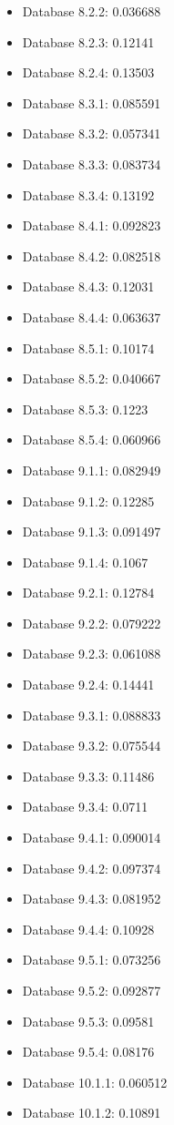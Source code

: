 \begin{itemize}
\item Database 8.2.2: 0.036688
\item Database 8.2.3: 0.12141
\item Database 8.2.4: 0.13503
\item Database 8.3.1: 0.085591
\item Database 8.3.2: 0.057341
\item Database 8.3.3: 0.083734
\item Database 8.3.4: 0.13192
\item Database 8.4.1: 0.092823
\item Database 8.4.2: 0.082518
\item Database 8.4.3: 0.12031
\item Database 8.4.4: 0.063637
\item Database 8.5.1: 0.10174
\item Database 8.5.2: 0.040667
\item Database 8.5.3: 0.1223
\item Database 8.5.4: 0.060966
\item Database 9.1.1: 0.082949
\item Database 9.1.2: 0.12285
\item Database 9.1.3: 0.091497
\item Database 9.1.4: 0.1067
\item Database 9.2.1: 0.12784
\item Database 9.2.2: 0.079222
\item Database 9.2.3: 0.061088
\item Database 9.2.4: 0.14441
\item Database 9.3.1: 0.088833
\item Database 9.3.2: 0.075544
\item Database 9.3.3: 0.11486
\item Database 9.3.4: 0.0711
\item Database 9.4.1: 0.090014
\item Database 9.4.2: 0.097374
\item Database 9.4.3: 0.081952
\item Database 9.4.4: 0.10928
\item Database 9.5.1: 0.073256
\item Database 9.5.2: 0.092877
\item Database 9.5.3: 0.09581
\item Database 9.5.4: 0.08176
\item Database 10.1.1: 0.060512
\item Database 10.1.2: 0.10891

\end{itemize}

